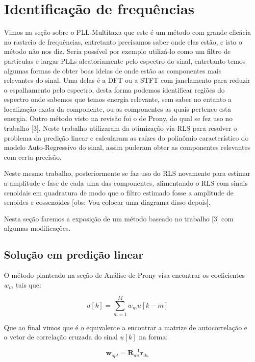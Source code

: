 
\section{Identificação de frequências}

\indent Vimos na seção sobre o PLL-Multitaxa que este é um método com grande eficácia no rastreio de frequências, entretanto precisamos saber onde elas estão, e isto o método não nos diz. Seria possível por exemplo utilizá-lo como um filtro de partículas e largar PLLs aleatoriamente pelo espectro do sinal, entretanto temos algumas formas de obter boas ideias de onde estão as componentes mais relevantes do sinal. Uma delas é a DFT ou a STFT com janelamento para reduzir o espalhamento pelo espectro, desta forma podemos identificar regiões do espectro onde sabemos que temos energia relevante, sem saber no entanto a localização exata da componente, ou as componentes as quais pertence esta energia. Outro método visto na revisão foi o de Prony, do qual se fez uso no trabalho [3]. Neste trabalho utilizaram da otimização via RLS para resolver o problema da predição linear e calcularam as raízes do polinômio característico do modelo Auto-Regressivo do sinal, assim puderam obter as componentes relevantes com certa precisão.

\indent Neste mesmo trabalho, posteriormente se faz uso do RLS novamente para estimar a amplitude e fase de cada uma das componentes, alimentando o RLS com sinais senoidais em quadratura de modo que o filtro estimado fosse a amplitude de senoides e cossenoides [obs: Vou colocar uma diagrama disso depois]. 

\indent Nesta seção faremos a exposição de um método baseado no trabalho [3] com algumas modificações.

\subsection{Solução em predição linear}

O método planteado na seção de Análise de Prony visa encontrar os coeficientes $w_m$ tais que:

\begin{equation}
u[k]=\sum_{m=1}^{M}w_m u[k-m]
\end{equation}

Que ao final vimos que é o equivalente a encontrar a matrize de autocorrelação e o vetor de correlação cruzada do sinal $u[k]$ na forma:

\begin{equation}
\boldsymbol{w}_{opt}=\boldsymbol{R}_{uu}^{-1}\boldsymbol{r}_{du}
\end{equation}

